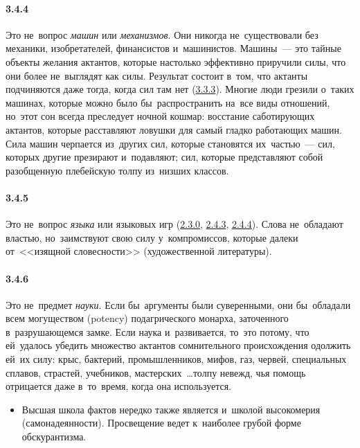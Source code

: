 \paragraph{3.4.4}\hypertarget{par:3.4.4}{} Это не~вопрос {\itshape машин} или {\itshape механизмов}. Они никогда не~существовали без механики, изобретателей, финансистов и~машинистов. Машины~--- это тайные объекты желания актантов, которые настолько эффективно приручили силы, что они более не~выглядят как
силы. Результат состоит в~том, что актанты подчиняются даже тогда, когда сил там нет (\hyperlink{par:3.3.3}{3.3.3}).
Многие люди грезили о~таких машинах, которые можно было бы~распространить на~все виды отношений, но~этот сон всегда преследует ночной кошмар: восстание саботирующих актантов, которые расставляют ловушки для самый гладко работающих машин. Сила машин черпается из~других сил, которые становятся их~частью~--- сил, которых другие презирают и~подавляют; сил, которые представляют собой разобщенную плебейскую толпу из~низших классов.

\paragraph{3.4.5}\hypertarget{par:3.4.5}{} Это не~вопрос {\itshape языка} или языковых игр (\hyperlink{par:2.3.0}{2.3.0}, \hyperlink{par:2.4.3}{2.4.3}, \hyperlink{par:2.4.4}{2.4.4}). Слова не~обладают властью, но~заимствуют свою силу у~компромиссов, которые далеки от~<<изящной словесности>> (художественной литературы).

\paragraph{3.4.6}\hypertarget{par:3.4.6}{} Это не~предмет {\itshape науки}. Если бы~аргументы были суверенными, они бы~обладали всем могуществом (potency) подагрического монарха, заточенного в~разрушающемся замке. Если наука и~развивается, то~это потому, что ей~удалось убедить множество актантов сомнительного происхождения одолжить ей~их силу: крыс, бактерий, промышленников, мифов, газ, червей, специальных сплавов, страстей, учебников, мастерских~\ldots толпу невежд, чья помощь отрицается даже в~то~время, когда она используется. 
	\begin{itemize}
	\item 
	Высшая школа фактов нередко также является и~школой высокомерия (самонадеянности). Просвещение ведет к~наиболее грубой форме обскурантизма.
	\end{itemize}

